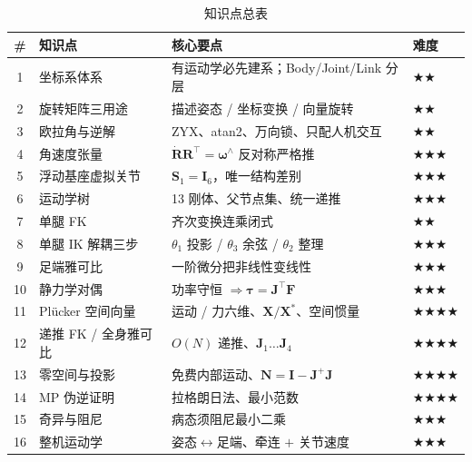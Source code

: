 \begin{table}[H]\centering\small
\caption{知识点总表}
\begin{tabular}{clll}
\toprule
\# & 知识点 & 核心要点 & 难度 \\
\midrule
1 & 坐标系体系 & 有运动学必先建系；Body/Joint/Link 分层 & \(\bigstar\bigstar\) \\
2 & 旋转矩阵三用途 & 描述姿态 / 坐标变换 / 向量旋转 & \(\bigstar\bigstar\) \\
3 & 欧拉角与逆解 & ZYX、atan2、万向锁、只配人机交互 & \(\bigstar\bigstar\) \\
4 & 角速度张量 & $\dot{\mathbf{R}}\mathbf{R}^\top=\boldsymbol{\omega}^\wedge$ 反对称严格推 & \(\bigstar\bigstar\bigstar\) \\
5 & 浮动基座虚拟关节 & $\mathbf{S}_1=\mathbf{I}_6$，唯一结构差别 & \(\bigstar\bigstar\bigstar\) \\
6 & 运动学树 & 13 刚体、父节点集、统一递推 & \(\bigstar\bigstar\bigstar\) \\
7 & 单腿 FK & 齐次变换连乘闭式 & \(\bigstar\bigstar\) \\
8 & 单腿 IK 解耦三步 & $\theta_1$ 投影 / $\theta_3$ 余弦 / $\theta_2$ 整理 & \(\bigstar\bigstar\bigstar\) \\
9 & 足端雅可比 & 一阶微分把非线性变线性 & \(\bigstar\bigstar\bigstar\) \\
10 & 静力学对偶 & 功率守恒 $\Rightarrow\boldsymbol{\tau}=\mathbf{J}^\top\mathbf{F}$ & \(\bigstar\bigstar\bigstar\) \\
11 & Plücker 空间向量 & 运动 / 力六维、$\mathbf{X}/\mathbf{X}^{*}$、空间惯量 & \(\bigstar\bigstar\bigstar\bigstar\) \\
12 & 递推 FK / 全身雅可比 & $O(N)$ 递推、$\mathbf{J}_1\dots\mathbf{J}_4$ & \(\bigstar\bigstar\bigstar\bigstar\) \\
13 & 零空间与投影 & 免费内部运动、$\mathbf{N}=\mathbf{I}-\mathbf{J}^{+}\mathbf{J}$ & \(\bigstar\bigstar\bigstar\bigstar\) \\
14 & MP 伪逆证明 & 拉格朗日法、最小范数 & \(\bigstar\bigstar\bigstar\bigstar\) \\
15 & 奇异与阻尼 & 病态须阻尼最小二乘 & \(\bigstar\bigstar\bigstar\) \\
16 & 整机运动学 & 姿态$\leftrightarrow$足端、牵连 $+$ 关节速度 & \(\bigstar\bigstar\bigstar\) \\
\bottomrule
\end{tabular}
\end{table}

